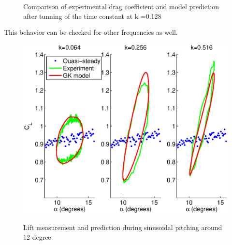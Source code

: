 \begin{figure}[h]
  \begin{center}
  \end{center}
  \caption{Comparison of experimental drag coefficient and model prediction after tunning of the time constant at k =0.128}
  \label{fig:Cd_u=3_meanaoa=12_amp=2_freq=0p5}
\end{figure}

\FloatBarrier

\par This behavior can be checked for other frequencies as well.

\begin{figure}[h]
  \begin{center}
    \scalebox{0.8}  
    {\includegraphics{./Figures/Pitching_allcases_GK_CL_12_amp_2.eps}}
  \end{center}
  \caption{Lift measurement and prediction during sinusoidal pitching around 12 degree} 
  \label{fig:Pitching_allcases_GK_Cl_12}
\end{figure}

